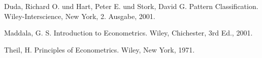 \begin{course}
\begin{literature}
  

Duda, Richard O. und Hart, Peter E. und Stork, David G. Pattern Classification. Wiley-Interscience, New York, 2. Ausgabe, 2001.

  

Maddala, G. S. Introduction to Econometrics. Wiley, Chichester, 3rd Ed., 2001.

 

Theil, H. Principles of Econometrics. Wiley, New York, 1971.

\end{literature}



\end{course}